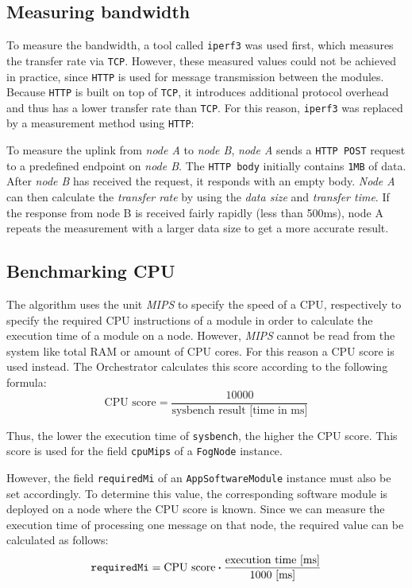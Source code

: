 \subsection{Measuring bandwidth\label{sec:measuring-bandwidth}}
To measure the bandwidth, a tool called \texttt{iperf3} was used first, which measures the transfer rate via \texttt{TCP}. However, these measured values could not be achieved in practice, since \texttt{HTTP} is used for message transmission between the modules. Because \texttt{HTTP} is built on top of \texttt{TCP}, it introduces additional protocol overhead and thus has a lower transfer rate than \texttt{TCP}. For this reason, \texttt{iperf3} was replaced by a measurement method using \texttt{HTTP}:

To measure the uplink from \textit{node A} to \textit{node B}, \textit{node A} sends a \texttt{HTTP POST} request to a predefined endpoint on \textit{node B}. The \texttt{HTTP body} initially contains \texttt{1MB} of data. After \textit{node B} has received the request, it responds with an empty body. \textit{Node A} can then calculate the \textit{transfer rate} by using the \textit{data size} and \textit{transfer time}.
If the response from node B is received fairly rapidly (less than 500ms), node A repeats the measurement with a larger data size to get a more accurate result.

\subsection{Benchmarking CPU\label{sec:benchmark-cpu}}
The algorithm uses the unit \textit{MIPS} to specify the speed of a CPU, respectively to specify the required CPU instructions of a module in order to calculate the execution time of a module on a node. However, \textit{MIPS} cannot be read from the system like total RAM or amount of CPU cores. For this reason a CPU score is used instead. The Orchestrator calculates this score according to the following formula:
\[\textrm{CPU score} = \frac{10000}{\textrm{sysbench result [time in ms]}}\]

Thus, the lower the execution time of \texttt{sysbench}, the higher the CPU score. This score is used for the field \texttt{cpuMips} of a \texttt{FogNode} instance.

However, the field \texttt{requiredMi} of an \texttt{AppSoftwareModule} instance must also be set accordingly. To determine this value, the corresponding software module is deployed on a node where the CPU score is known. Since we can measure the execution time of processing one message on that node, the required value can be calculated as follows:
\[\textrm{\texttt{requiredMi}} = \textrm{CPU score} \boldsymbol{\cdot} \frac{\textrm{execution time [ms]}}{1000 \textrm{ [ms]}}\]


